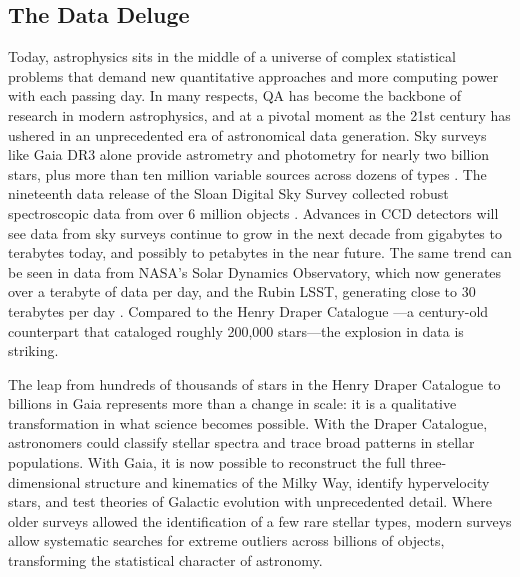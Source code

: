 \documentclass[preprint,longauthor]{aastex631}
\numberwithin{equation}{section}
\begin{document}
\subsection{The Data Deluge}

Today, astrophysics sits in the middle of a universe of complex statistical problems that demand new quantitative approaches and more computing power with each passing day. In many respects, QA has become the backbone of research in modern astrophysics, and at a pivotal moment as the 21st century has ushered in an unprecedented era of astronomical data generation. Sky surveys like Gaia DR3 alone provide astrometry and photometry for nearly two billion stars, plus more than ten million variable sources across dozens of types \citep{gaiacollaborationGaiaDataRelease2023}. The nineteenth data release of the Sloan Digital Sky Survey collected robust spectroscopic data from over 6 million objects \citep{collaborationNineteenthDataRelease2025}. Advances in CCD detectors will see data from sky surveys continue to grow in the next decade from gigabytes to terabytes today, and possibly to petabytes in the near future. The same trend can be seen in data from NASA's Solar Dynamics Observatory, which now generates over a terabyte of data per day, and the Rubin LSST, generating close to 30 terabytes per day \citep{borneAstroinformatics21stCentury2009}. Compared to the Henry Draper Catalogue \citep{cannonHenryDraperCatalogue1918}—a century-old counterpart that cataloged roughly 200,000 stars—the explosion in data is striking.

The leap from hundreds of thousands of stars in the Henry Draper Catalogue to billions in Gaia represents more than a change in scale: it is a qualitative transformation in what science becomes possible. With the Draper Catalogue, astronomers could classify stellar spectra and trace broad patterns in stellar populations. With Gaia, it is now possible to reconstruct the full three-dimensional structure and kinematics of the Milky Way, identify hypervelocity stars, and test theories of Galactic evolution with unprecedented detail. Where older surveys allowed the identification of a few rare stellar types, modern surveys allow systematic searches for extreme outliers across billions of objects, transforming the statistical character of astronomy.
\end{document}
